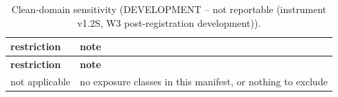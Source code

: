 \begingroup\footnotesize
\begin{longtable}{>{\raggedright\arraybackslash}p{126.4pt}>{\raggedright\arraybackslash}p{304.6pt}}
\caption{Clean-domain sensitivity (DEVELOPMENT -- not reportable (instrument v1.2S, W3 post-registration development)).} \\
\toprule
\textbf{restriction} & \textbf{note} \\
\midrule
\endfirsthead
\toprule
\textbf{restriction} & \textbf{note} \\
\midrule
\endhead
\bottomrule
\endfoot
not applicable & no exposure classes in this manifest, or nothing to exclude \\
\end{longtable}
\endgroup
